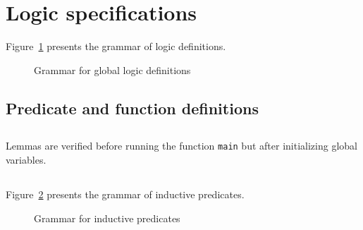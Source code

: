 \section{Logic specifications}
\label{sec:logicspec}

\nodiff

Figure~\ref{fig:gram:logic} presents the grammar of logic definitions.

\begin{figure}[htbp]
  \caption{Grammar for global logic definitions}
\label{fig:gram:logic}
\end{figure}


\subsection{Predicate and function definitions}
\nodiff


\subsection{}
\nodiff

Lemmas are verified before running the function \lstinline|main| but after
initializing global variables.


\subsection{}
\label{sec:inductivepredicates}
\experimental

\nodiff

Figure~\ref{fig:gram:inductive} presents the grammar of inductive predicates.

\begin{figure}[htbp]
  \caption{Grammar for inductive predicates}
\label{fig:gram:inductive}
\end{figure}

